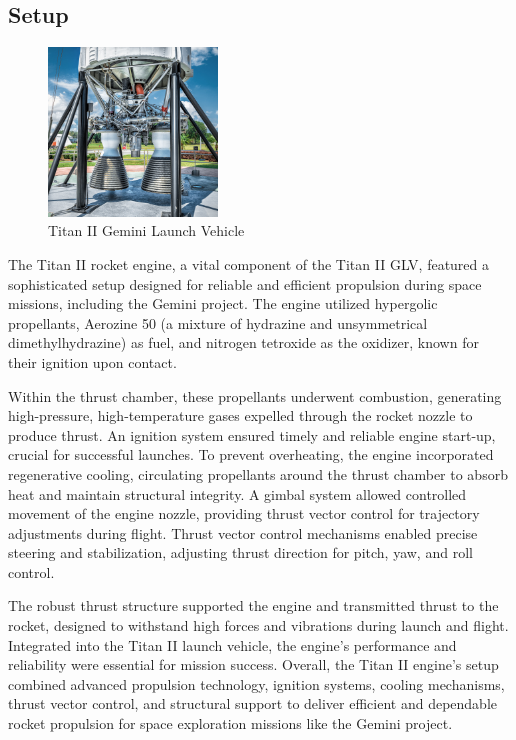 \documentclass[8pt]{article} %
\begin{document}
\subsection{Setup}
\begin{figure}
  \begin{center}
    \includegraphics[width=0.4\textwidth]{./titanII.jpg}
  \end{center}
  \caption{Titan II Gemini Launch Vehicle}
  \label{fig:titanII}
\end{figure}
The Titan II rocket engine, a vital component of the Titan II GLV, featured a sophisticated setup designed for reliable and efficient propulsion during space missions, including the Gemini project. The engine utilized hypergolic propellants, Aerozine 50 (a mixture of hydrazine and unsymmetrical dimethylhydrazine) as fuel, and nitrogen tetroxide as the oxidizer, known for their ignition upon contact.

Within the thrust chamber, these propellants underwent combustion, generating high-pressure, high-temperature gases expelled through the rocket nozzle to produce thrust. An ignition system ensured timely and reliable engine start-up, crucial for successful launches. To prevent overheating, the engine incorporated regenerative cooling, circulating propellants around the thrust chamber to absorb heat and maintain structural integrity. A gimbal system allowed controlled movement of the engine nozzle, providing thrust vector control for trajectory adjustments during flight. Thrust vector control mechanisms enabled precise steering and stabilization, adjusting thrust direction for pitch, yaw, and roll control.

The robust thrust structure supported the engine and transmitted thrust to the rocket, designed to withstand high forces and vibrations during launch and flight. Integrated into the Titan II launch vehicle, the engine's performance and reliability were essential for mission success. Overall, the Titan II engine's setup combined advanced propulsion technology, ignition systems, cooling mechanisms, thrust vector control, and structural support to deliver efficient and dependable rocket propulsion for space exploration missions like the Gemini project.
\end{document}

